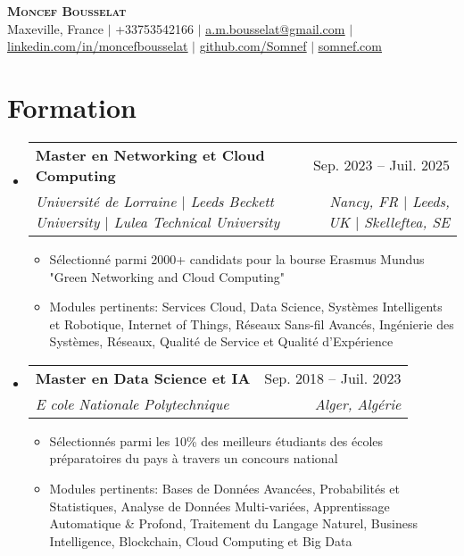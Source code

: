 \documentclass[letterpaper,10.5t]{article}
\makeatletter
\newcommand{\resumeItem}[1]{
  \item\small{
    {#1 \vspace{-2pt}}
  }
}
\newcommand{\resumeSubheading}[4]{
  \vspace{-2pt}\item
    \begin{tabular*}{0.97\textwidth}[t]{l@{\extracolsep{\fill}}r}
      \textbf{#1} & #2 \\
      \textit{\small#3} & \textit{\small #4} \\
    \end{tabular*}\vspace{-7pt}
}
\newcommand{\resumeSubHeadingListStart}{\begin{itemize}[leftmargin=0.15in, label={}]}
\newcommand{\resumeSubHeadingListEnd}{\end{itemize}}
\newcommand{\resumeItemListStart}{\begin{itemize}}
\newcommand{\resumeItemListEnd}{\end{itemize}\vspace{-5pt}}
\makeatother
\begin{document}

\begin{center}
    \textbf{\Huge \scshape Moncef Bousselat} \\ \vspace{1pt}
    \small Maxeville, France $|$ 
    \small +33753542166 $|$ 
    \href{mailto:a.m.bousselat@gmail.com@gmail.com}{\underline{a.m.bousselat@gmail.com}} $|$ 
    \href{https://www.linkedin.com/in/moncefbousselat/}{\underline{linkedin.com/in/moncefbousselat}} $|$
    \href{https://github.com/Somnef}{\underline{github.com/Somnef}} $|$
    \href{https://www.somnef.com}{\underline{somnef.com}}
\end{center}


\section{Formation}
    \resumeSubHeadingListStart
        \resumeSubheading
        {Master en Networking et Cloud Computing}{Sep. 2023 -- Juil. 2025}
        {Université de Lorraine $|$ Leeds Beckett University $|$ Lulea Technical University}{Nancy, FR $|$ Leeds, UK $|$ Skelleftea, SE}
            \resumeItemListStart
                \resumeItem{Sélectionné parmi 2000+ candidats pour la bourse Erasmus Mundus "Green Networking and Cloud Computing"}
                \resumeItem{Modules pertinents: Services Cloud, Data Science, Systèmes Intelligents et Robotique, Internet of Things, Réseaux Sans-fil Avancés, Ingénierie des Systèmes, Réseaux, Qualité de Service et Qualité d'Expérience}
            \resumeItemListEnd
      
        \resumeSubheading
        {Master en Data Science et IA}{Sep. 2018 -- Juil. 2023}
        {E   cole Nationale Polytechnique}{Alger, Algérie}
            \resumeItemListStart
                \resumeItem{Sélectionnés parmi les 10\% des meilleurs étudiants des écoles préparatoires du pays à travers un concours national}
                \resumeItem{Modules pertinents: Bases de Données Avancées, Probabilités et Statistiques, Analyse de Données Multi-variées, Apprentissage Automatique \& Profond, Traitement du Langage Naturel, Business Intelligence, Blockchain, Cloud Computing et Big Data}
            \resumeItemListEnd
  \resumeSubHeadingListEnd
\end{document}
